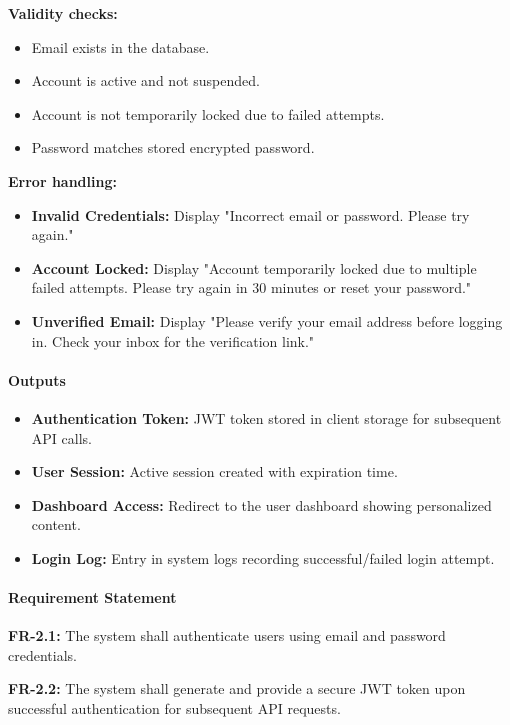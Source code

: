 \documentclass[12pt,a4paper]{article}
\begin{document}
\textbf{Validity checks:}
\begin{itemize}
    \item Email exists in the database.
    \item Account is active and not suspended.
    \item Account is not temporarily locked due to failed attempts.
    \item Password matches stored encrypted password.
\end{itemize}

\textbf{Error handling:}
\begin{itemize}
    \item \textbf{Invalid Credentials:} Display "Incorrect email or password. Please try again."
    \item \textbf{Account Locked:} Display "Account temporarily locked due to multiple failed attempts. Please try again in 30 minutes or reset your password."
    \item \textbf{Unverified Email:} Display "Please verify your email address before logging in. Check your inbox for the verification link."
\end{itemize}

\paragraph{Outputs}
\begin{itemize}
    \item \textbf{Authentication Token:} JWT token stored in client storage for subsequent API calls.
    \item \textbf{User Session:} Active session created with expiration time.
    \item \textbf{Dashboard Access:} Redirect to the user dashboard showing personalized content.
    \item \textbf{Login Log:} Entry in system logs recording successful/failed login attempt.
\end{itemize}

\paragraph{Requirement Statement}
\textbf{FR-2.1:} The system shall authenticate users using email and password credentials.

\textbf{FR-2.2:} The system shall generate and provide a secure JWT token upon successful authentication for subsequent API requests.
\end{document}
